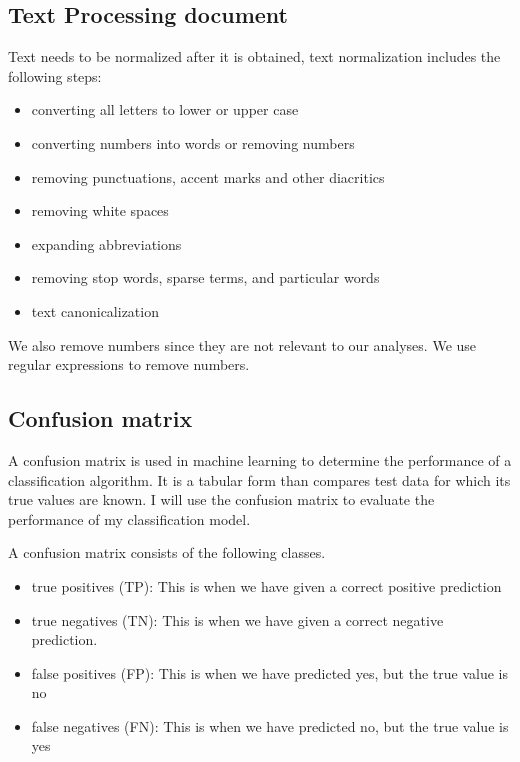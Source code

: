 \subsection{Text Processing document}
Text needs to be normalized after it is obtained, text normalization includes the following steps:
\begin{itemize}
\item converting all letters to lower or upper case
\item converting numbers into words or removing numbers
\item removing punctuations, accent marks and other diacritics
\item removing white spaces
\item expanding abbreviations
\item removing stop words, sparse terms, and particular words
\item text canonicalization
\end{itemize}

We also remove numbers since they are not relevant to our analyses. We use regular expressions to remove numbers.




\subsection{Confusion matrix}
A confusion matrix is used in machine learning to determine the performance of a classification algorithm. It is a tabular form than compares test data for which its true values are known. I will use the confusion matrix to evaluate the performance of my classification model.

A confusion matrix consists of the following classes.
 \begin{itemize}

\item
true positives (TP): This is when we have given a correct positive prediction

\item
true negatives (TN): This is when we have given a correct negative prediction.

\item
false positives (FP): This is when we have predicted yes, but the true value is no

\item
false negatives (FN): This is when we have predicted no, but the true value is yes

\end{itemize}

